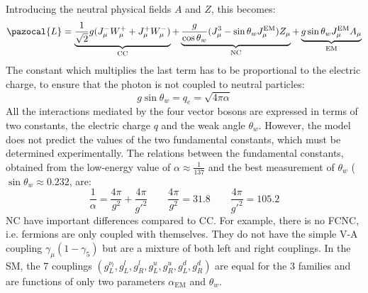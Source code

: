 \documentclass[10.75pt,a4paper,openright,bottom=2cm]{article}
\begin{document}
Introducing the neutral physical fields $A$ and $Z$, this becomes:
\[
\pazocal{L}=\underbrace{\frac{1}{\sqrt{2}}g(J_\mu^-W_\mu^++J_\mu^+W_\mu^-)}_{\text{CC}}+\underbrace{\frac{g}{\cos\theta_w}(J_\mu^3-\sin\theta_wJ_\mu^{\text{EM}})Z_\mu}_{\text{NC}}+\underbrace{g\sin\theta_wJ_\mu^{\text{EM}}A_\mu}_{\text{EM}}
\]
The constant which multiplies the last term has to be proportional to the electric charge, to ensure that the photon is not coupled to neutral particles:
\[
g\sin\theta_w=q_e=\sqrt{4\pi\alpha}
\]
All the interactions mediated by the four vector bosons are expressed in terms of two constants, the electric charge $q$ and the weak angle $\theta_w$. However, the model does not predict the values of the two fundamental constants, which must be determined experimentally. The relations between the fundamental constants, obtained from the low-energy value of $\alpha\approx\frac{1}{137}$ and the best measurement of $\theta_w$ ($\sin\theta_w\approx0.232$, are:
\[
\frac{1}{\alpha}=\frac{4\pi}{g^2}+\frac{4\pi}{g'^2} \qquad \frac{4\pi}{g^2}=31.8 \qquad \frac{4\pi}{g'^2}=105.2
\]
NC have important differences compared to CC. For example, there is no FCNC, i.e. fermions are only coupled with themselves. They do not have the simple V-A coupling $\gamma_\mu(1-\gamma_5)$ but are a mixture of both left and right couplings. In the SM, the 7 couplings $(g_L^{\nu_l}, g_L^l, g_R^l, g_L^u, g_R^u, g_L^d, g_R^d)$ are equal for the 3 families and are functions of only two parameters $\alpha_{\text{EM}}$ and $\theta_w$. 
\end{document}
